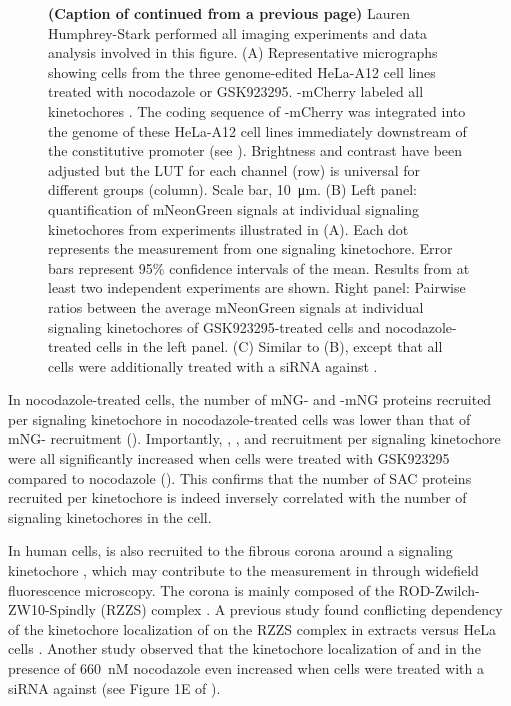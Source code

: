\begin{figure}
    \noindent\justifying \textbf{(Caption of  continued from a previous page)} Lauren Humphrey-Stark performed all imaging experiments and data analysis involved in this figure. (A) Representative micrographs showing cells from the three genome-edited HeLa-A12 cell lines treated with nocodazole or GSK923295. -mCherry labeled all kinetochores \cite{Kukreja2020}. The coding sequence of -mCherry was integrated into the genome of these HeLa-A12 cell lines immediately downstream of the constitutive  promoter (see ). Brightness and contrast have been adjusted but the LUT for each channel (row) is universal for different groups (column). Scale bar, \SI{10}{\micro m}. (B) Left panel: quantification of mNeonGreen signals at individual signaling kinetochores from experiments illustrated in (A). Each dot represents the measurement from one signaling kinetochore. Error bars represent 95\% confidence intervals of the mean. Results from at least two independent experiments are shown. Right panel: Pairwise ratios between the average mNeonGreen signals at individual signaling kinetochores of GSK923295-treated cells and nocodazole-treated cells in the left panel. (C) Similar to (B), except that all cells were additionally treated with a siRNA against .
\end{figure}

In nocodazole-treated cells, the number of mNG- and -mNG proteins recruited per signaling kinetochore in nocodazole-treated cells was lower than that of mNG- recruitment (). Importantly, , , and  recruitment per signaling kinetochore were all significantly increased when cells were treated with GSK923295 compared to nocodazole (). This confirms that the number of SAC proteins recruited per kinetochore is indeed inversely correlated with the number of signaling kinetochores in the cell.

In human cells,  is also recruited to the fibrous corona around a signaling kinetochore \cite{RZZ-MAD1vsBUB1-MAD1_2015, RZZ-MAD1vsBUB1-MAD1_2018}, which may contribute to the measurement in  through widefield fluorescence microscopy. The corona is mainly composed of the ROD-Zwilch-ZW10-Spindly (RZZS) complex \cite{RZZS_Sacristan2018, RZZS_Raisch2022}. A previous study found conflicting dependency of the kinetochore localization of  on the RZZS complex in  extracts versus HeLa cells \cite{BUBR1_XenopusVSHeLa}. Another study observed that the kinetochore localization of  and  in the presence of \SI{660}{nM} nocodazole even increased when cells were treated with a siRNA against  (see Figure 1E of \cite{siROD_Zhang2019}).

